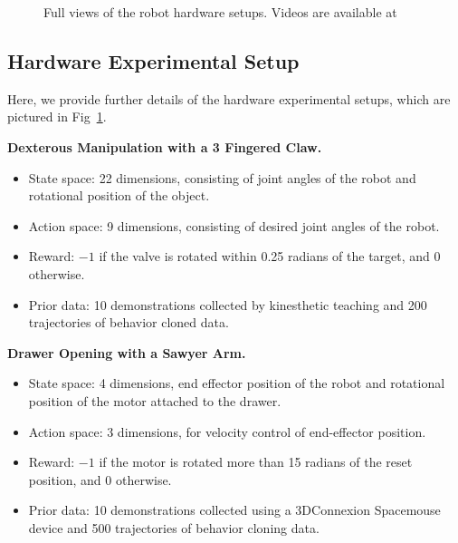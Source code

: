 \begin{figure}[t]
\begin{subfigure}[b]{0.32\textwidth}
    \end{subfigure}
    \caption{
    Full views of the robot hardware setups. Videos are available at \projectpage
    }
    \label{fig:robot_setups}
\end{figure}

\pagebreak

\subsection{Hardware Experimental Setup}
\label{sec:hardwaresetup}

Here, we provide further details of the hardware experimental setups, which are pictured in Fig~\ref{fig:robot_setups}.

\noindent \textbf{Dexterous Manipulation with a 3 Fingered Claw.}
\begin{itemize}
    \item State space: 22 dimensions, consisting of joint angles of the robot and rotational position of the object. 
    \item Action space: 9 dimensions, consisting of desired joint angles of the robot.
    \item Reward: $-1$ if the valve is rotated within 0.25 radians of the target, and $0$ otherwise.
    \item Prior data: 10 demonstrations collected by kinesthetic teaching and 200 trajectories of behavior cloned data.
\end{itemize}

\noindent \textbf{Drawer Opening with a Sawyer Arm.}
\begin{itemize}
    \item State space: 4 dimensions, end effector position of the robot and rotational position of the motor attached to the drawer. 
    \item Action space: 3 dimensions, for velocity control of end-effector position.
    \item Reward: $-1$ if the motor is rotated more than 15 radians of the reset position, and $0$ otherwise.
    \item Prior data: 10 demonstrations collected using a 3DConnexion Spacemouse device and 500 trajectories of behavior cloning data.
\end{itemize}

